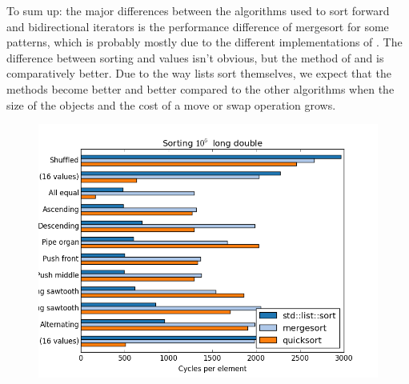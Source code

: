 \documentclass{isocpp_proposal}
\begin{document}
\begin{appendices}
To sum up: the major differences between the algorithms used to sort forward and bidirectional iterators is the performance difference of mergesort for some patterns, which is probably mostly due to the different implementations of . The difference between sorting  and  values isn't obvious, but the  method of  and  is comparatively better. Due to the way lists sort themselves, we expect that the  methods become better and better compared to the other algorithms when the size of the objects and the cost of a move or swap operation grows.

\begin{figure}[h]
\includegraphics[width=\textwidth]{list-long-double.png}
\end{figure}


\end{appendices}

\newpage


\end{document}
